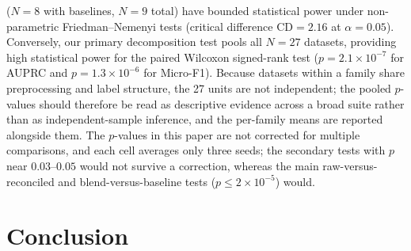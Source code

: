 \documentclass[preprint,12pt]{elsarticle}
\begin{document}
\begin{itemize}[leftmargin=*,nosep]
    ($N{=}8$ with baselines, $N{=}9$ total) have bounded statistical power under
    non-parametric Friedman--Nemenyi tests (critical difference $\text{CD} =
    2.16$ at $\alpha = 0.05$). Conversely, our primary decomposition test pools
    all $N{=}27$ datasets, providing high statistical power for the paired
    Wilcoxon signed-rank test ($p = 2.1 \times 10^{-7}$ for AUPRC and
    $p = 1.3 \times 10^{-6}$ for Micro-F1). Because datasets within a family
    share preprocessing and label structure, the 27 units are not independent;
    the pooled $p$-values should therefore be read as descriptive evidence
    across a broad suite rather than as independent-sample inference, and the
    per-family means are reported alongside them. The $p$-values in this paper
    are not corrected for multiple comparisons, and each cell averages only
    three seeds; the secondary tests with $p$ near $0.03$--$0.05$ would not
    survive a correction, whereas the main raw-versus-reconciled and
    blend-versus-baseline tests ($p \le 2 \times 10^{-5}$) would.
\end{itemize}

\section{Conclusion}
\end{document}
